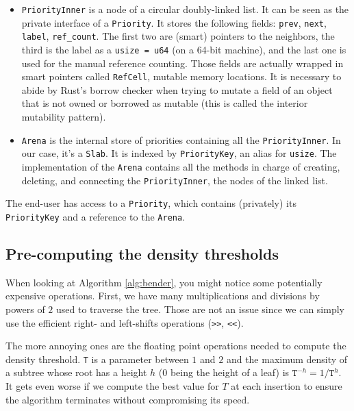 \documentclass[12pt]{article}
\begin{document}
\begin{itemize}
    \item \lstinline{PriorityInner} is a node of a circular doubly-linked list. It can be seen as the private interface of a \lstinline{Priority}. It stores the following fields: \lstinline{prev}, \lstinline{next}, \lstinline{label}, \lstinline{ref_count}. The first two are (smart) pointers to the neighbors, the third is the label as a \lstinline{usize = u64} (on a 64-bit machine), and the last one is used for the manual reference counting. Those fields are actually wrapped in smart pointers called \lstinline{RefCell}, mutable memory locations. It is necessary to abide by Rust's borrow checker when trying to mutate a field of an object that is not owned or borrowed as mutable (this is called the interior mutability pattern).
    \item \lstinline{Arena} is the internal store of priorities containing all the \lstinline{PriorityInner}. In our case, it's a \lstinline{Slab}. It is indexed by \lstinline{PriorityKey}, an alias for \lstinline{usize}. The implementation of the \lstinline{Arena} contains all the methods in charge of creating, deleting, and connecting the \lstinline{PriorityInner}, the nodes of the linked list.
\end{itemize}

The end-user has access to a \lstinline{Priority}, which contains (privately) its \lstinline{PriorityKey} and a reference to the \lstinline{Arena}.

\subsection{Pre-computing the density thresholds} \label{precompute}

When looking at Algorithm \ref{alg:bender}, you might notice some potentially expensive operations.
First, we have many multiplications and divisions by powers of $2$ used to traverse the tree. Those are not an issue since we can simply use the efficient right- and left-shifts operations (\texttt{>>}, \texttt{<<}).

The more annoying ones are the floating point operations needed to compute the density threshold.
\texttt{T} is a parameter between $1$ and $2$ and the maximum density of a subtree whose root has a height $h$ ($0$ being the height of a leaf) is $\texttt{T}^{-h} = 1 / \texttt{T}^h$.
It gets even worse if we compute the best value for $T$ at each insertion to ensure the algorithm terminates without compromising its speed.
\end{document}

